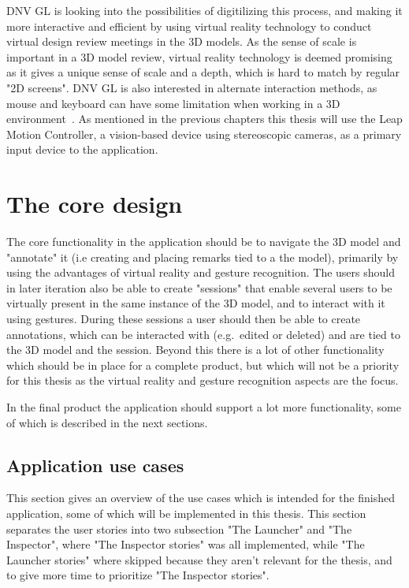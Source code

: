 DNV GL is looking into the possibilities of digitilizing this process, and making it more interactive and efficient by using
virtual reality technology to conduct virtual design review meetings in the 3D models. 
As the sense of scale is important in a 3D model review, virtual reality technology is deemed promising as it gives a unique sense of scale
and a depth, which is hard to match by regular "2D screens". DNV GL is also interested in alternate interaction methods, as mouse and keyboard 
can have some limitation when working in a 3D environment~\citep{Rautaray2015}. As mentioned in the previous chapters this thesis will use 
the Leap Motion Controller, a vision-based device using stereoscopic cameras, as a primary input device to the application. 

\section{The core design} 
The core functionality in the application should be to navigate the 3D model and "annotate" it (i.e creating and placing remarks tied to a the model), 
primarily by using the advantages of virtual reality and gesture recognition. 
The users should in later iteration also be able to create "sessions" that enable several users to be virtually present 
in the same instance of the 3D model, and to interact with it using gestures. During these sessions a user should then be able to create annotations, 
which can be interacted with (e.g.~edited or deleted) and are tied to the 3D model and the session. 
Beyond this there is a lot of other functionality which should be in place for a complete product, but which will not be a priority 
for this thesis as the virtual reality and gesture recognition aspects are the focus. 

In the final product the application should support a lot more functionality, some of which is described in the next sections.


\subsection{Application use cases}
This section gives an overview of the use cases which is intended for the finished application, some of which will be implemented in this thesis. 
This section separates the user stories into two subsection "The Launcher" and "The Inspector", where "The Inspector stories" was all implemented, while
"The Launcher stories" where skipped because they aren't relevant for the thesis, and to give more time to prioritize "The Inspector stories".



